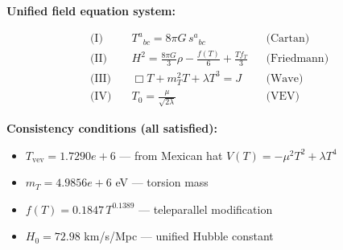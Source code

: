 
\textbf{Unified field equation system:}

\begin{align}
  \text{(I)} \quad & T^a{}_{bc} = 8\pi G \, s^a{}_{bc} && \text{(Cartan)} \\
  \text{(II)} \quad & H^2 = \frac{8\pi G}{3}\rho - \frac{f(T)}{6} + \frac{Tf_T}{3} && \text{(Friedmann)} \\
  \text{(III)} \quad & \Box T + m_T^2 T + \lambda T^3 = J && \text{(Wave)} \\
  \text{(IV)} \quad & T_0 = \frac{\mu}{\sqrt{2\lambda}} && \text{(VEV)}
\end{align}

\textbf{Consistency conditions (all satisfied):}
\begin{itemize}
  \item $T_{\text{vev}} = 1.7290e+6$ — from Mexican hat $V(T) = -\mu^2 T^2 + \lambda T^4$
  \item $m_T = 4.9856e+6$ eV — torsion mass
  \item $f(T) = 0.1847 \, T^{0.1389}$ — teleparallel modification
  \item $H_0 = 72.98$ km/s/Mpc — unified Hubble constant
\end{itemize}
